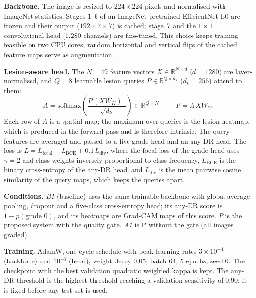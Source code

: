 \textbf{Backbone.} The image is resized to $224\times224$ pixels and normalised with ImageNet statistics. Stages 1--6 of an ImageNet-pretrained EfficientNet-B0 \cite{tan2019} are frozen and their output ($192\times7\times7$) is cached; stage~7 and the $1\times1$ convolutional head (1{,}280 channels) are fine-tuned. This choice keeps training feasible on two CPU cores; random horizontal and vertical flips of the cached feature maps serve as augmentation.

\textbf{Lesion-aware head.} The $N=49$ feature vectors $X\in\mathbb{R}^{N\times d}$ ($d=1280$) are layer-normalised, and $Q=8$ learnable lesion queries $P\in\mathbb{R}^{Q\times d_k}$ ($d_k=256$) attend to them:
\begin{equation}
A=\mathrm{softmax}\!\left(\frac{P\,(XW_K)^{\top}}{\sqrt{d_k}}\right)\in\mathbb{R}^{Q\times N},\qquad F=A\,XW_V .
\end{equation}
Each row of $A$ is a spatial map; the maximum over queries is the lesion heatmap, which is produced in the forward pass and is therefore intrinsic. The query features are averaged and passed to a five-grade head and an any-DR head. The loss is $L=L_{\mathrm{focal}}+L_{\mathrm{BCE}}+0.1\,L_{\mathrm{div}}$, where the focal loss \cite{lin2020} of the grade head uses $\gamma=2$ and class weights inversely proportional to class frequency, $L_{\mathrm{BCE}}$ is the binary cross-entropy of the any-DR head, and $L_{\mathrm{div}}$ is the mean pairwise cosine similarity of the query maps, which keeps the queries apart.

\textbf{Conditions.} \emph{B1} (baseline) uses the same trainable backbone with global average pooling, dropout and a five-class cross-entropy head; its any-DR score is $1-p(\text{grade }0)$, and its heatmaps are Grad-CAM maps \cite{selvaraju2020} of this score. \emph{P} is the proposed system with the quality gate. \emph{A1} is P without the gate (all images graded).

\textbf{Training.} AdamW, one-cycle schedule with peak learning rates $3\times10^{-4}$ (backbone) and $10^{-3}$ (head), weight decay 0.05, batch 64, 5 epochs, seed 0. The checkpoint with the best validation quadratic weighted kappa is kept. The any-DR threshold is the highest threshold reaching a validation sensitivity of 0.90; it is fixed before any test set is used.

